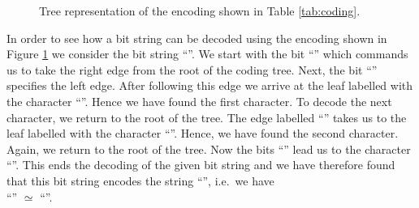 \begin{figure}[!ht]
  \centering
  \caption{Tree representation of the encoding shown in Table \ref{tab:coding}.}
  \label{fig:coding-tree}
\end{figure}
In order to see how a bit string can be decoded using the encoding shown in Figure \ref{fig:coding-tree}
we consider the bit string ``''.  We start with the bit ``'' which commands us to take
the right edge from the root of the coding tree.  Next, the bit ``'' specifies the left edge.  
After following this edge we arrive at the leaf labelled with the character ``''.  Hence we have
found the first character.  To decode the next character, we return to the root of the tree.  The edge labelled
``'' takes us to the leaf labelled with the character ``''.  Hence, we have found the
second character.  Again, we return to the root of the tree.  Now the bits ``'' lead us to the
character ``''.  This ends the decoding of the given bit string and we have therefore found that this
bit string encodes the string ``'', i.e.~we have
\\[0.2cm]
\hspace*{1.3cm}
``'' $\simeq$ ``''.



